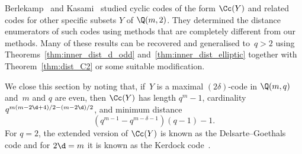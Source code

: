 \par
Berlekamp~\cite{Ber1970} and Kasami~\cite{Kas1971} studied cyclic codes of the form $\Cc(Y)$ and related codes for other specific subsets $Y$ of $\Q(m,2)$. They determined the distance enumerators of such codes using methods that are completely different from our methods. Many of these results can be recovered and generalised to~$q>2$ using Theorems~\ref{thm:inner_dist_d_odd} and~\ref{thm:inner_dist_elliptic} together with Theorem~\ref{thm:dist_C2} or some suitable modification.
\par
We close this section by noting that, if~$Y$ is a maximal $(2\delta)$-code in $\Q(m,q)$ and~$m$ and $q$ are even, then $\Cc(Y)$ has length $q^m-1$, cardinality $q^{m(m-2\d+4)/2-(m-2\d)/2}$, and minimum distance
\[
(q^{m-1}-q^{m-\delta-1})(q-1)-1.
\]
For $q=2$, the extended version of $\Cc(Y)$ is known as the Delsarte--Goethals code and for $2\d=m$ it is known as the Kerdock code~\cite[Ch.~15]{MacSlo1977}.

